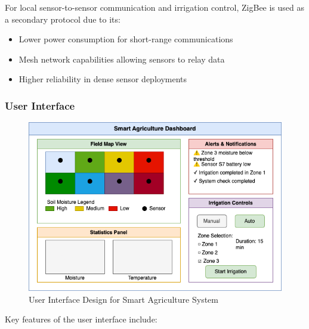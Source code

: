 \documentclass[12pt,a4paper]{article}
\begin{document}
For local sensor-to-sensor communication and irrigation control, ZigBee is used as a secondary protocol due to its:

\begin{itemize}
    \item Lower power consumption for short-range communications
    \item Mesh network capabilities allowing sensors to relay data
    \item Higher reliability in dense sensor deployments
\end{itemize}

\subsubsection{User Interface}

\begin{figure}[H]
\centering
\includegraphics[width=\textwidth]{img/drawio/ui_design.png}
\caption{User Interface Design for Smart Agriculture System}
\label{fig:ui}
\end{figure}

Key features of the user interface include:
\end{document}
